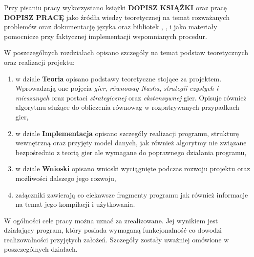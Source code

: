 \documentclass{standalone}
\begin{document}
Przy pisaniu pracy wykorzystano książki \textbf{DOPISZ KSIĄŻKI} oraz pracę \textbf{DOPISZ PRACĘ} jako źródła wiedzy teoretycznej na temat rozważanych
problemów oraz dokumentację języka  oraz bibliotek , ,  i  jako materiały pomocnicze przy faktycznej
implementacji wspomnianych procedur.

W poszczególnych rozdziałach opisano szczegóły na temat podstaw teoretycznych oraz realizacji projektu:
\begin{enumerate}
\item w dziale \textbf{Teoria} opisano podstawy teoretyczne stojące za projektem. Wprowadzają one pojęcia \textit{gier}, \textit{równowag Nasha},
\textit{strategii czystych i mieszanych} oraz postaci \textit{strategicznej} oraz \textit{ekstensywnej} gier. Opisuje również algorytmu służące do
obliczenia równowag w rozpatrywanych przypadkach gier,
\item w dziale \textbf{Implementacja} opisano szczegóły realizacji programu, strukturę wewnętrzną oraz przyjęty model danych, jak również algorytmy
nie związane bezpośrednio z teorią gier ale wymagane do poprawnego działania programu,
\item w dziale \textbf{Wnioski} opisano wnioski wyciągnięte podczas rozwoju projektu oraz możliwości dalszego jego rozwoju,
\item załączniki zawierają co ciekawsze fragmenty programu jak również informacje na temat jego kompilacji i użytkowania.
\end{enumerate}

W ogólności cele pracy można uznać za zrealizowane. Jej wynikiem jest działający program, który posiada wymaganą funkcjonalność co dowodzi realizowalności
przyjętych założeń. Szczegóły zostały uważniej omówione w poszczególnych działach.
\end{document}
